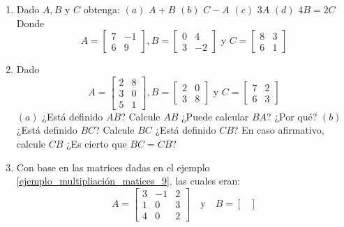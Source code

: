 \begin{ejercicio}
    \begin{enumerate}
        \item Dado \(A, B\) y \(C\) obtenga: 
        \((a)\) \(A+B\) \quad \((b)\) \(C - A\) \quad \((c)\) \(3A\) \quad \((d)\) \(4B = 2C\)
        Donde 
        \[
        A = \begin{bmatrix}
            7 & -1 \\
            6 & 9 
        \end{bmatrix}
        , B= \begin{bmatrix}
            0 & 4 \\
            3 & -2 
        \end{bmatrix} 
        \text{ y }
        C = \begin{bmatrix}
            8 & 3 \\
            6 & 1
        \end{bmatrix}
        \]
        \item Dado  
        \[
        A = \begin{bmatrix}
            2 & 8 \\ 
            3 & 0 \\
            5 & 1 
        \end{bmatrix}
        , B = \begin{bmatrix}
            2 & 0 \\
            3 & 8 
        \end{bmatrix}
        \text{ y }
        C = \begin{bmatrix}
            7 & 2 \\
            6 & 3
        \end{bmatrix}
        \] 
        \((a)\) ¿Está definido \(AB\)? Calcule \(AB\) ¿Puede calcular \(BA\)? ¿Por qué?
        \((b)\) ¿Está definido \(BC\)? Calcule \(BC\) ¿Está definido \(CB\)? En caso afirmativo, calcule \(CB\) ¿Es cierto que \(BC =CB\)?
        \item Con base en las matrices dadas en el ejemplo \ref{ejemplo_multipliación_matices_9}, las cuales eran:
            \[
            A = \begin{bmatrix}
                3 & -1 & 2 \\
                1 & 0 & 3 \\
                4 & 0 & 2 
            \end{bmatrix}
            \quad
            \text{y}
            \quad
            B = \begin{bmatrix}

\end{bmatrix}\]
\end{enumerate}
\end{ejercicio}
